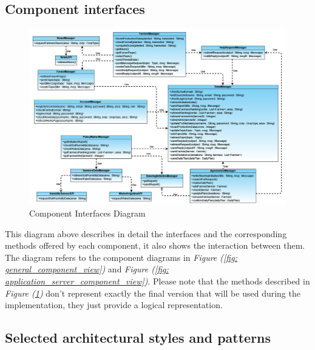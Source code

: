 \documentclass[table, 12pt]{article}
\begin{document}
\newpage
\subsection{Component interfaces}

\begin{center}
    \begin{figure}[H]
        \includegraphics[scale=0.60, center]{assets/component-interfaces.png}
        \caption{Component Interfaces Diagram}
        \label{fig: component_interfaces}
    \end{figure}
\end{center}

This diagram above describes in detail the interfaces and the corresponding methods offered by each component, it also shows the interaction between them.
The diagram refers to the component diagrams in \textit{Figure (\ref{fig: general_component_view})} and \textit{Figure (\ref{fig: application_server_component_view})}.
Please note that the methods described in \textit{Figure (\ref{fig: component_interfaces})} don't represent exactly the final version that will be used during the implementation, they just provide a logical representation.

\subsection{Selected architectural styles and patterns}
\end{document}
